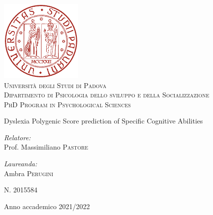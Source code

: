 \begin{titlepage} 
\begin{center}
\includegraphics[width=0.3\textwidth]{logoRed.eps}
\\
\vspace{2.0cm}
\textsc{\Large Università degli Studi di Padova}\\
\vspace{0.50cm}
\textsc{\large Dipartimento di Psicologia dello sviluppo e della Socializzazione}\\
\vspace{0.50cm} 
\textsc{\large PhD Program in Psychological Sciences}\hspace{0.8cm}\\
  
\vspace{2.0cm}
\huge \doublespacing \bfseries \begin{spacing}{1}{Dyslexia Polygenic Score prediction of Specific Cognitive Abilities}\end{spacing}
\vspace{2.0cm}
\vfill
\begin{minipage}[c]{0.48\linewidth}
    \begin{flushleft} \large
    \emph{Relatore:} \\
    Prof. Massimiliano \textsc{Pastore}
\end{flushleft}
\end{minipage}%
\hfill%
\begin{minipage}[c]{0.48\linewidth}
    \begin{flushright} \large
    \emph{Laureanda:}\\
    Ambra \textsc{Perugini}

    \textsc{N. 2015584}
    \end{flushright}
    \vfill
\end{minipage}


\vfill
\vspace{2.00cm}
 
{\small Anno accademico 2021/2022} 
\end{center}



\end{titlepage}
